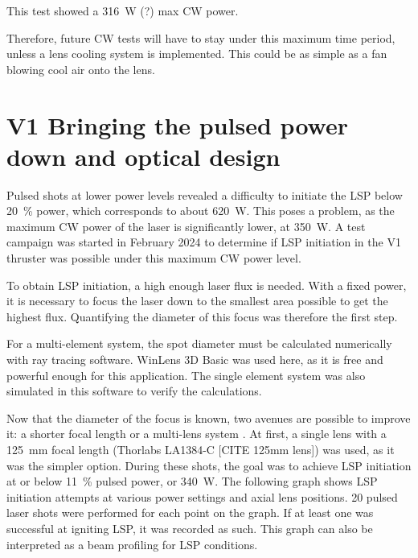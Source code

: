                 This test showed a \qty{316}{W} (?) max CW power.
    
                Therefore, future CW tests will have to stay under this maximum time period, unless a lens cooling system is implemented. This could be as simple as a fan blowing cool air onto the lens.

            \section{V1 Bringing the pulsed power down and optical design} \label{sec:pulse_power_down_V1}
            
                Pulsed shots at lower power levels revealed a difficulty to initiate the LSP below \qty{20}{\%} power, which corresponds to about \qty{620}{W}. This poses a problem, as the maximum CW power of the laser is significantly lower, at \qty{350}{W}. A test campaign was started in February 2024 to determine if LSP initiation in the V1 thruster was possible under this maximum CW power level.
                
                To obtain LSP initiation, a high enough laser flux is needed. With a fixed power, it is necessary to focus the laser down to the smallest area possible to get the highest flux. Quantifying the diameter of this focus was therefore the first step. 
    
    
                For a multi-element system, the spot diameter must be calculated numerically with ray tracing software. WinLens 3D Basic \cite{QioptiqQShopFree} was used here, as it is free and powerful enough for this application. The single element system was also simulated in this software to verify the calculations.
    
                Now that the diameter of the focus is known, two avenues are possible to improve it: a shorter focal length or a multi-lens system \cite{LensTutorial}. At first, a single lens with a \qty{125}{mm} focal length (Thorlabs LA1384-C [CITE 125mm lens]) was used, as it was the simpler option. During these shots, the goal was to achieve LSP initiation at or below \qty{11}{\%} pulsed power, or \qty{340}{W}. The following graph shows LSP initiation attempts at various power settings and axial lens positions. 20 pulsed laser shots were performed for each point on the graph. If at least one was successful at igniting LSP, it was recorded as such. This graph can also be interpreted as a beam profiling for LSP conditions.
                
